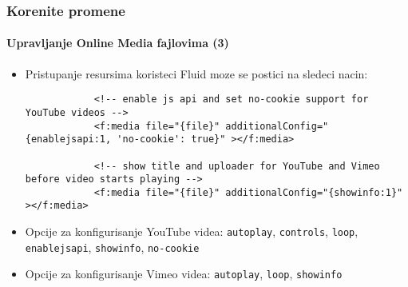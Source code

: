 \begin{frame}[fragile]
	\frametitle{Korenite promene}
	\framesubtitle{Upravljanje Online Media fajlovima (3)}

	\lstset{basicstyle=\tiny\ttfamily}

	\begin{itemize}

		\item Pristupanje resursima koristeci Fluid moze se postici na sledeci nacin:

		\begin{lstlisting}
			<!-- enable js api and set no-cookie support for YouTube videos -->
			<f:media file="{file}" additionalConfig="{enablejsapi:1, 'no-cookie': true}" ></f:media>

			<!-- show title and uploader for YouTube and Vimeo before video starts playing -->
			<f:media file="{file}" additionalConfig="{showinfo:1}" ></f:media>
		\end{lstlisting}

		\item Opcije za konfigurisanje YouTube videa:\newline
			\small
				\texttt{autoplay}, \texttt{controls}, \texttt{loop}, \texttt{enablejsapi}, \texttt{showinfo}, \texttt{no-cookie}
			\normalsize

		\item Opcije za konfigurisanje Vimeo videa:\newline
			\small
				\texttt{autoplay}, \texttt{loop}, \texttt{showinfo}
			\normalsize
	\end{itemize}

\end{frame}


